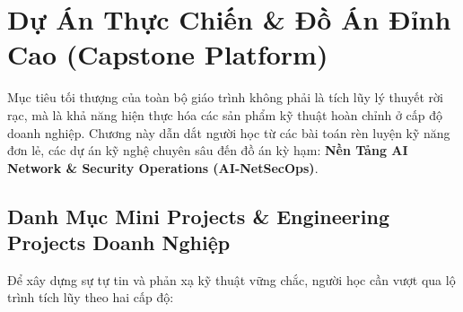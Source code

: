 
\chapter{Dự Án Thực Chiến \& Đồ Án Đỉnh Cao (Capstone Platform)}
\label{ch:phase8-capstone}

Mục tiêu tối thượng của toàn bộ giáo trình không phải là tích lũy lý thuyết rời rạc, mà là khả năng hiện thực hóa các sản phẩm kỹ thuật hoàn chỉnh ở cấp độ doanh nghiệp. Chương này dẫn dắt người học từ các bài toán rèn luyện kỹ năng đơn lẻ, các dự án kỹ nghệ chuyên sâu đến đồ án kỳ hạm: \textbf{Nền Tảng AI Network \& Security Operations (AI-NetSecOps)}.

\section{Danh Mục Mini Projects \& Engineering Projects Doanh Nghiệp}
\label{sec:capstone-projects-catalog}

Để xây dựng sự tự tin và phản xạ kỹ thuật vững chắc, người học cần vượt qua lộ trình tích lũy theo hai cấp độ:

